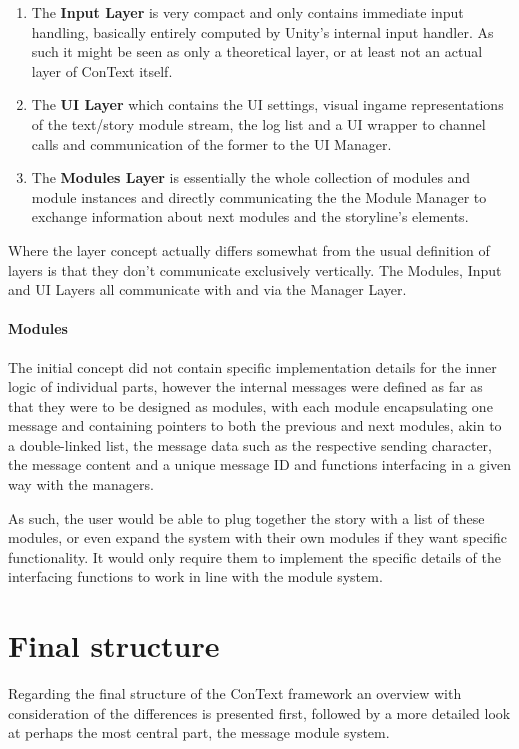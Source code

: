 \begin{enumerate}
\item The \textbf{Input Layer} is very compact and only contains immediate input handling,  basically entirely computed by Unity's internal input handler. As such it might be seen as only a theoretical layer, or at least not an actual layer of ConText itself.
\item The \textbf{UI Layer} which contains the UI settings, visual ingame representations of the text/story module stream, the log list and a UI wrapper to channel calls and communication of the former to the UI Manager.
\item The \textbf{Modules Layer} is essentially the whole collection of modules and module instances and directly communicating the the Module Manager to exchange information about next modules and the storyline's elements.
\end{enumerate}
Where the layer concept actually differs somewhat from the usual definition of layers is that they don't communicate exclusively vertically. The Modules, Input and UI Layers all communicate with and via the Manager Layer.
\paragraph{Modules} The initial concept did not contain specific implementation details for the inner logic of individual parts, however the internal messages were defined as far as that they were to be designed as modules, with each module encapsulating one message and containing pointers to both the previous and next modules, akin to a double-linked list, the message data such as the respective sending character, the message content and a unique message ID and functions interfacing in a given way with the managers. 

As such, the user would be able to plug together the story with a list of these modules, or even expand the system with their own modules if they want specific functionality. It would only require them to implement the specific details of the interfacing functions to work in line with the module system. 

\section{Final structure}
Regarding the final structure of the ConText framework an overview with consideration of the differences is presented first, followed by a more detailed look at perhaps the most central part, the message module system. 
